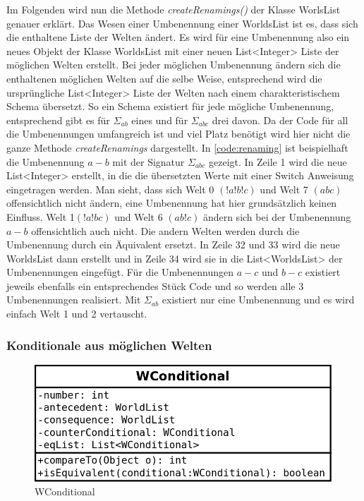 \documentclass[12pt,a4paper]{article}
\begin{document}
Im Folgenden wird nun die Methode \textit{createRenamings()} der Klasse WorlsList genauer erklärt. Das Wesen einer Umbenennung einer WorldsList ist es, dass sich die enthaltene Liste der Welten ändert. Es wird für eine Umbenennung also ein neues Objekt der Klasse WorldsList mit einer neuen List<Integer> Liste der möglichen Welten erstellt. Bei jeder möglichen Umbenennung ändern sich die enthaltenen möglichen Welten auf die selbe Weise, entsprechend wird die ursprüngliche List<Integer> Liste der Welten nach einem charakteristischem Schema \glqq übersetzt\grqq. So ein Schema existiert für jede mögliche Umbenennung, entsprechend gibt es für $\Sigma_{ab}$ eines und für $\Sigma_{abc}$ drei davon. Da der Code für all die Umbenennungen umfangreich ist und viel Platz benötigt wird hier nicht die ganze Methode \textit{createRenamings} dargestellt. In \ref{code:renaming} ist beispielhaft die Umbenennung $a-b$ mit der Signatur $\Sigma_{abc}$ gezeigt. In Zeile 1 wird die neue List<Integer> erstellt, in die die übersetzten Werte mit einer Switch Anweisung eingetragen werden. Man sieht, dass sich  Welt 0 $(!a!b!c)$ und Welt 7 $(abc)$ offensichtlich nicht ändern, eine Umbenennung hat hier grundsätzlich keinen Einfluss. Welt 1$(!a!bc)$ und Welt 6 $(ab!c)$ ändern sich bei der Umbenennung $a-b$ offensichtlich auch nicht. Die andern Welten werden durch die Umbenennung durch ein Äquivalent ersetzt. In Zeile 32 und 33 wird die neue WorldsList dann erstellt und in Zeile 34 wird sie in die List<WorldsList> der Umbenennungen eingefügt.  Für die Umbenennungen $a-c$ und $b-c$ existiert jeweils ebenfalls ein entsprechendes Stück Code und so werden alle 3 Umbenennungen realisiert. Mit $\Sigma_{ab}$ existiert nur eine Umbenennung und es wird einfach Welt 1 und 2 vertauscht.




\subsubsection{Konditionale aus möglichen Welten} 

\begin{figure}
\includegraphics[width=0.55\linewidth]{bilder/wconditional.png}
\caption{WConditional}
\label{pic:wconditional}
\end{figure}
\end{document}
